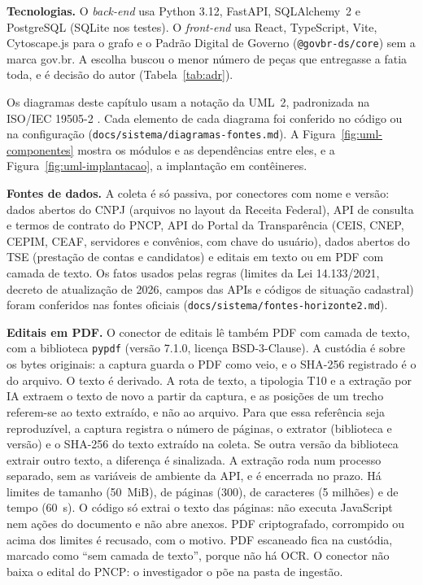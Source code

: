 \textbf{Tecnologias.} O \textit{back-end} usa Python 3.12, FastAPI,
SQLAlchemy~2 e PostgreSQL (SQLite nos testes). O \textit{front-end} usa
React, TypeScript, Vite, Cytoscape.js para o grafo e o Padrão Digital de
Governo (\texttt{@govbr-ds/core}) sem a marca gov.br. A escolha buscou o
menor número de peças que entregasse a fatia toda, e é decisão do autor
(Tabela~\ref{tab:adr}).

Os diagramas deste capítulo usam a notação da UML~2, padronizada na ISO/IEC
19505-2 \cite{iso19505-2}. Cada elemento de cada diagrama foi conferido no
código ou na configuração (\texttt{docs/sistema/diagramas-fontes.md}). A Figura~\ref{fig:uml-componentes} mostra os módulos e as dependências entre
eles, e a Figura~\ref{fig:uml-implantacao}, a implantação em contêineres.




\textbf{Fontes de dados.} A coleta é só passiva, por conectores com nome e
versão: dados abertos do CNPJ (arquivos no layout da Receita Federal), API de
consulta e termos de contrato do PNCP, API do Portal da Transparência (CEIS,
CNEP, CEPIM, CEAF, servidores e convênios, com chave do usuário), dados abertos do TSE (prestação de
contas e candidatos) e editais em texto ou em PDF com camada de texto. Os
fatos usados pelas regras (limites
da Lei 14.133/2021, decreto de atualização de 2026, campos das APIs e códigos
de situação cadastral) foram conferidos nas fontes oficiais
(\texttt{docs/sistema/fontes-horizonte2.md}).

\textbf{Editais em PDF.} O conector de editais lê também PDF com camada de
texto, com a biblioteca \texttt{pypdf} (versão 7.1.0, licença BSD-3-Clause).
A custódia é sobre os bytes originais: a captura guarda o PDF como veio, e o
SHA-256 registrado é o do arquivo. O texto é derivado. A rota de texto, a
tipologia T10 e a extração por IA extraem o texto de novo a partir da
captura, e as posições de um trecho referem-se ao texto extraído, e não ao
arquivo. Para que essa referência seja reproduzível, a captura registra o
número de páginas, o extrator (biblioteca e versão) e o SHA-256 do texto
extraído na coleta. Se outra versão da biblioteca extrair outro texto, a
diferença é sinalizada. A extração roda num processo separado, sem as
variáveis de ambiente da API, e é encerrada no prazo. Há limites de tamanho
(50~MiB), de páginas (300), de caracteres (5 milhões) e de tempo (60~s). O
código só extrai o texto das páginas: não executa JavaScript nem ações do
documento e não abre anexos. PDF criptografado, corrompido ou acima dos
limites é recusado, com o motivo. PDF escaneado fica na custódia, marcado como
``sem camada de texto'', porque não há OCR. O conector não baixa o edital do
PNCP: o investigador o põe na pasta de ingestão.

